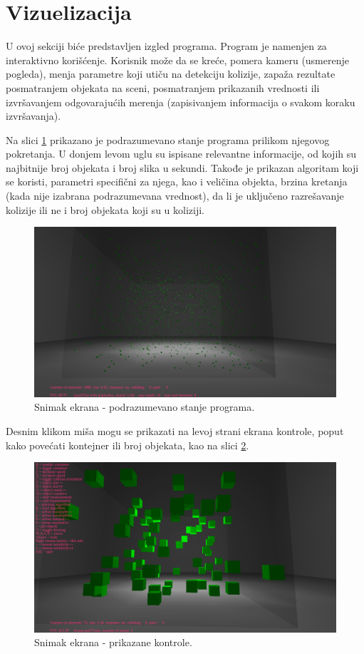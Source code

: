 \documentclass[12pt,oneside]{memoir}
\begin{document}
\section{Vizuelizacija}

U ovoj sekciji biće predstavljen izgled programa. 
Program je namenjen za interaktivno korišćenje. 
Korisnik može da se kreće, pomera kameru (usmerenje pogleda), menja parametre koji utiču na detekciju kolizije,
zapaža rezultate posmatranjem objekata na sceni, posmatranjem prikazanih vrednosti ili izvršavanjem odgovarajućih merenja
(zapisivanjem informacija o svakom koraku izvršavanja).

Na slici \ref{fig:ssdefault} prikazano je podrazumevano stanje programa prilikom njegovog pokretanja.
U donjem levom uglu su ispisane relevantne informacije, od kojih su najbitnije broj objekata 
i broj slika u sekundi. Takođe je prikazan algoritam koji se koristi, parametri specifični za njega, kao 
i veličina objekta, brzina kretanja (kada nije izabrana podrazumevana vrednost),  da li je uključeno razrešavanje kolizije ili ne  i
broj objekata koji su u koliziji.

\begin{figure}[h!]
	\centerfloat
	\includegraphics[scale=0.3]{ssdefault.png}
	\caption{Snimak ekrana - podrazumevano stanje programa.}
	\label{fig:ssdefault}
\end{figure}

\noindent Desnim klikom miša mogu se prikazati 
na levoj strani ekrana kontrole,
poput kako povećati kontejner ili broj objekata, kao na slici \ref{fig:ssinfo}.

\begin{figure}[h!]
	\centerfloat
	\includegraphics[scale=0.3]{ssinfo.png}
	\caption{Snimak ekrana - prikazane kontrole.}
	\label{fig:ssinfo}
\end{figure}
\end{document}
